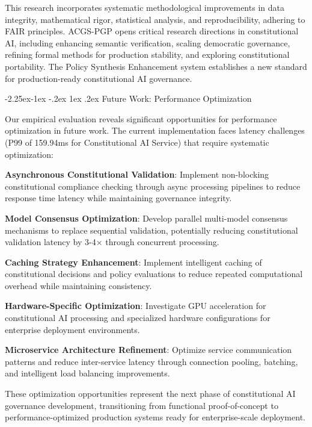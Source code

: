 \documentclass[manuscript,screen,9pt]{acmart}
\makeatletter
\renewcommand\subsection{\@startsection{subsection}{2}{\z@}%
  {-2.25ex\@plus -1ex \@minus -.2ex}%
  {1ex \@plus .2ex}%
  {\normalfont\large\bfseries}}
\makeatother
\begin{document}
This research incorporates systematic methodological improvements in data integrity, mathematical rigor, statistical analysis, and reproducibility, adhering to FAIR principles. ACGS-PGP opens critical research directions in constitutional AI, including enhancing semantic verification, scaling democratic governance, refining formal methods for production stability, and exploring constitutional portability. The Policy Synthesis Enhancement system establishes a new standard for production-ready constitutional AI governance.

\subsection{Future Work: Performance Optimization}
\label{subsec:future_performance_optimization}

Our empirical evaluation reveals significant opportunities for performance optimization in future work. The current implementation faces latency challenges (P99 of 159.94ms for Constitutional AI Service) that require systematic optimization:

\noindent\textbf{Asynchronous Constitutional Validation}: Implement non-blocking constitutional compliance checking through async processing pipelines to reduce response time latency while maintaining governance integrity.

\noindent\textbf{Model Consensus Optimization}: Develop parallel multi-model consensus mechanisms to replace sequential validation, potentially reducing constitutional validation latency by 3-4× through concurrent processing.

\noindent\textbf{Caching Strategy Enhancement}: Implement intelligent caching of constitutional decisions and policy evaluations to reduce repeated computational overhead while maintaining consistency.

\noindent\textbf{Hardware-Specific Optimization}: Investigate GPU acceleration for constitutional AI processing and specialized hardware configurations for enterprise deployment environments.

\noindent\textbf{Microservice Architecture Refinement}: Optimize service communication patterns and reduce inter-service latency through connection pooling, batching, and intelligent load balancing improvements.

These optimization opportunities represent the next phase of constitutional AI governance development, transitioning from functional proof-of-concept to performance-optimized production systems ready for enterprise-scale deployment.
\end{document}
